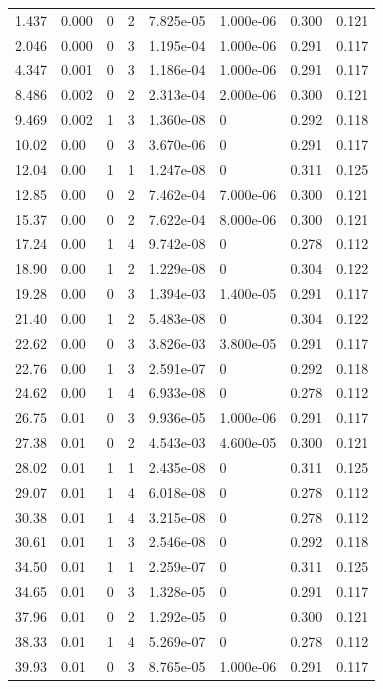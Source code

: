 \documentclass[preview]{standalone}
\begin{document}
{{\begin{tabular}{L{1.2cm}C{1.2cm} C{0.3cm}C{0.5cm} C{1.4cm}C{1.4cm} C{1.4cm}C{1.4cm}}
  1.437  &  0.000  & 0     &  2 &  7.825e-05  & 1.000e-06  & 0.300 &  0.121   \\ 
  2.046  &  0.000  & 0     &  3 &  1.195e-04  & 1.000e-06  & 0.291 &  0.117   \\ 
  4.347  &  0.001  & 0     &  3 &  1.186e-04  & 1.000e-06  & 0.291 &  0.117   \\ 
  8.486  &  0.002  & 0     &  2 &  2.313e-04  & 2.000e-06  & 0.300 &  0.121   \\ 
  9.469  &  0.002  & 1     &  3 &  1.360e-08  & 0  & 0.292 &  0.118   \\ 
  10.02  &  0.00  & 0     &  3 &  3.670e-06  & 0  & 0.291 &  0.117   \\ 
  12.04  &  0.00  & 1     &  1 &  1.247e-08  & 0  & 0.311 &  0.125   \\ 
  12.85  &  0.00  & 0     &  2 &  7.462e-04  & 7.000e-06  & 0.300 &  0.121   \\ 
  15.37  &  0.00  & 0     &  2 &  7.622e-04  & 8.000e-06  & 0.300 &  0.121   \\ 
  17.24  &  0.00  & 1     &  4 &  9.742e-08  & 0  & 0.278 &  0.112   \\ 
  18.90  &  0.00  & 1     &  2 &  1.229e-08  & 0  & 0.304 &  0.122   \\ 
  19.28  &  0.00  & 0     &  3 &  1.394e-03  & 1.400e-05  & 0.291 &  0.117   \\ 
  21.40  &  0.00  & 1     &  2 &  5.483e-08  & 0  & 0.304 &  0.122   \\ 
  22.62  &  0.00  & 0     &  3 &  3.826e-03  & 3.800e-05  & 0.291 &  0.117   \\ 
  22.76  &  0.00  & 1     &  3 &  2.591e-07  & 0  & 0.292 &  0.118   \\ 
  24.62  &  0.00  & 1     &  4 &  6.933e-08  & 0  & 0.278 &  0.112   \\ 
  26.75  &  0.01  & 0     &  3 &  9.936e-05  & 1.000e-06  & 0.291 &  0.117   \\ 
  27.38  &  0.01  & 0     &  2 &  4.543e-03  & 4.600e-05  & 0.300 &  0.121   \\ 
  28.02  &  0.01  & 1     &  1 &  2.435e-08  & 0  & 0.311 &  0.125   \\ 
  29.07  &  0.01  & 1     &  4 &  6.018e-08  & 0  & 0.278 &  0.112   \\ 
  30.38  &  0.01  & 1     &  4 &  3.215e-08  & 0  & 0.278 &  0.112   \\ 
  30.61  &  0.01  & 1     &  3 &  2.546e-08  & 0  & 0.292 &  0.118   \\ 
  34.50  &  0.01  & 1     &  1 &  2.259e-07  & 0  & 0.311 &  0.125   \\ 
  34.65  &  0.01  & 0     &  3 &  1.328e-05  & 0  & 0.291 &  0.117   \\ 
  37.96  &  0.01  & 0     &  2 &  1.292e-05  & 0  & 0.300 &  0.121   \\ 
  38.33  &  0.01  & 1     &  4 &  5.269e-07  & 0  & 0.278 &  0.112   \\ 
  39.93  &  0.01  & 0     &  3 &  8.765e-05  & 1.000e-06  & 0.291 &  0.117   \\ 
\hline 
\end{tabular} 

}}
\end{document}
